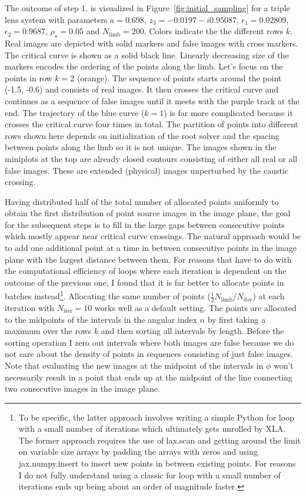 \documentclass[12pt,dvipsnames]{report}
\newcommand{\ssf}[1]{\textsf{#1}}
\begin{document}
The outcome of step 1. is visualized in Figure~\ref{fig:initial_sampling} for a triple lens 
system with parameters $a=0.698$, $z_3=-0.0197 - i0.95087$, $\epsilon_1=0.02809$, 
$\epsilon_2=0.9687$, $\rho_\star=0.05$ and $N_\mathrm{limb}=200$. 
Colors indicate the the different rows $k$. Real images are depicted with solid markers and 
false images with cross markers. The critical curve is shown as a solid black line. Linearly 
decreasing size of the markers encodes the ordering of the points along the limb.
Let's focus on the points in row $k=2$ (orange). The sequence of points starts around the 
point (-1.5, -0.6) and consists  of real images. It then crosses the critical curve and 
continues as a sequence of false images until it meets with the purple track at the end. 
The trajectory of the blue curve ($k=1$) is far more complicated because 
it crosses the critical curve four times in total. The partition of points into different rows
shown here depends on initialization of the root solver and the spacing between points along 
the limb so it is not unique. The images shown in the miniplots at the top are already closed 
contours consisting of either all real or all false images. These are extended (physical) 
images unperturbed by the caustic crossing.

Having distributed half of the total number of allocated points uniformly to obtain the first 
distribution of point source images in the image plane, the goal for the subsequent steps is 
to fill in the large gaps between consecutive points which mostly appear near critical 
curve crossings. The natural approach would be to add one additional point at a time in 
between consecutive points in the image plane with the largest distance between them.
For reasons that have to do with the computational efficiency of loops where each
iteration is dependent on the outcome of the previous one, I found that it is far 
better to allocate points in batches instead\footnote{To be specific, the latter approach 
involves writing a simple \ssf{Python} \ssf{for} loop with a small number of iterations which 
ultimately gets unrolled by \ssf{XLA}. The former approach requires the use of \ssf{lax.scan}
and getting around the limit on variable size arrays by padding the arrays with zeros and using
\ssf{jax.numpy.insert} to insert new points in between existing points. For reasons I do not
fully understand using a classic \ssf{for} loop with a small number of iterations ends up being 
about an order of magnitude faster.}. Allocating the same number of points 
($\frac{1}{2}N_\mathrm{limb}/N_\mathrm{iter}$) at each iteration  with $N_\mathrm{iter}=10$ 
works well as a default setting. The points are allocated to the midpoints of the intervals 
in the angular index $n$ by first taking a maximum over the rows $k$ and then sorting all 
intervals by length. Before the sorting operation I zero out intervals where both images 
are false because we do not care about the density of points in sequences consisting of just
false images. Note that evaluating the new images at the midpoint of the intervals in 
$\phi$ won't necessarily result in a point that ends up at the midpoint of the line 
connecting two consecutive images in the image plane.
\end{document}
